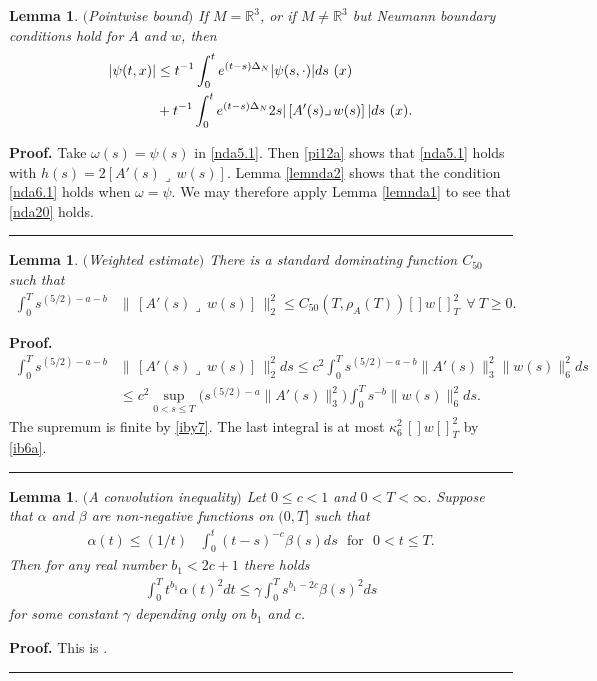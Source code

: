 \documentclass[12pt]{article}
\newtheorem{lemma}[theorem]{Lemma}
\newenvironment{proof}[1][Proof]{\textbf{#1.} }{\ \rule{0.5em}{0.5em}}
\def \R{\mathbb R}
\def \w{\omega}
\def \nn{[]}
\def \eref{\eqref}
\def \lrc{\lrcorner\,}
\numberwithin{equation}{section}
\begin{document}
 \begin{lemma} \label{lemnda3}$($Pointwise bound$)$ If $M=\R^3$, or if $M\ne \R^3$ but
 Neumann boundary conditions hold for $A$ and $w$, then
 \begin{align}
 |\psi(t, x)|&\le  t^{-1} \int_0^t e^{(t-s)\Delta_N} |\psi(s, \cdot)| ds\ (x)   \notag\\
 & + t^{-1}\int_0^t e^{(t-s)\Delta_N} 2 s|\, [A'(s) \lrc w(s)]\, | ds \ (x) .       \label{nda20}
 \end{align}
 \end{lemma}
 \begin{proof} 
 Take $\w(s) = \psi(s)$ in \eref{nda5.1}. Then \eref{pi12a} shows that \eref{nda5.1} holds with  
  $h(s) =2[A'(s)\lrc w(s)]$.
  Lemma \ref{lemnda2}
  shows that  the condition \eref{nda6.1} holds when $\w = \psi$. 
  We may therefore apply Lemma \ref{lemnda1}
   to see that \eref{nda20} holds. 
 \end{proof}

 

 \begin{lemma} \label{lemnda4} $($Weighted estimate$)$  
 There is a standard dominating function  $C_{50}$ 
   such that     
 \begin{align}
\int_0^T s^{(5/2)- a -b} &\|\, [A'(s) \lrc w(s)]\, \|_2^2 
 \le  C_{50}(T, \rho_A(T)) \nn w\nn_T^2  \ \  \forall\ T \ge 0         .     \label{nda25}
\end{align}
\end{lemma} 
         \begin{proof}
\begin{align*}
\int_0^T s^{(5/2)- a -b} &\|\, [A'(s) \lrc w(s)]\, \|_2^2 ds
 \le c^2 \int_0^T s^{(5/2)-a -b} \|A'(s)\|_3^2 \| w(s)\|_6^2 ds \\
 &\le c^2 \sup_{0 < s \le T}\Big(s^{(5/2)-a} \|A'(s)\|_3^2\Big) \int_0^T s^{-b}  \| w(s)\|_6^2 ds.
\end{align*} 
The supremum is finite  by \eref{iby7}.
The last integral is at most $\kappa_6^2\, \nn w\nn_T^2$ by \eref{ib6a}.
\end{proof}





\begin{lemma}\label{lemu1}$($A convolution inequality$)$
          Let $0 \le c <1$ and $0 < T < \infty$.  Suppose that  $\alpha$ and $\beta$ are
          non-negative functions  on $(0, T]$ such that
\begin{align}
\alpha(t) \le (1/t)&\int_0^t (t-s)^{-c}  \beta(s) ds\ \ \ \text{for}\ \ \ 0 < t \le T .  \label{u31}
\end{align}
Then for any real number $b_1 < 2c+1$ there holds
\begin{align}
\int_0^T t^{b_1} \alpha(t)^2 dt \le \gamma \int_0^T s^{b_1 -2c} \beta(s)^2 ds                 \label{u32}
\end{align}
for some constant $\gamma$ depending only on $b_1$ and $c$.
\end{lemma}
     \begin{proof} This is \cite[Lemma 4.24]{G70}. 
     \end{proof}
   
\end{document}
